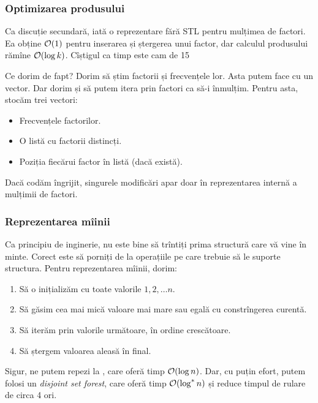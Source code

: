 \documentclass[../main.tex]{subfiles}
\begin{document}
\subsubsection*{Optimizarea produsului}

Ca discuție secundară, iată o reprezentare fără STL pentru mulțimea de factori. Ea obține $\mathcal{O}(1)$ pentru inserarea și ștergerea unui factor, dar calculul produsului rămîne $\mathcal{O}(\log k)$. Cîștigul ca timp este cam de 15%

Ce dorim de fapt? Dorim să știm factorii și frecvențele lor. Asta putem face cu un vector. Dar dorim și să putem itera prin factori ca să-i înmulțim. Pentru asta, stocăm trei vectori:

\begin{itemize}
  \item Frecvențele factorilor.

  \item O listă cu factorii distincți.

  \item Poziția fiecărui factor în listă (dacă există).
\end{itemize}

Dacă codăm îngrijit, singurele modificări apar doar în reprezentarea internă a mulțimii de factori.

\subsubsection*{Reprezentarea mîinii}

Ca principiu de inginerie, nu este bine să trîntiți prima structură care vă vine în minte. Corect este să porniți de la operațiile pe care trebuie să le suporte structura. Pentru reprezentarea mîinii, dorim:

\begin{enumerate}
  \item Să o inițializăm cu toate valorile $1, 2, \dots n$.
  \item Să găsim cea mai mică valoare mai mare sau egală cu constrîngerea curentă.
  \item Să iterăm prin valorile următoare, în ordine crescătoare.
  \item Să ștergem valoarea aleasă în final.
\end{enumerate}

Sigur, ne putem repezi la , care oferă timp $\mathcal{O}(\log n)$. Dar, cu puțin efort, putem folosi un \textit{disjoint set forest}, care oferă timp $\mathcal{O}(\log^{*} n)$ și reduce timpul de rulare de circa 4 ori.
\end{document}
